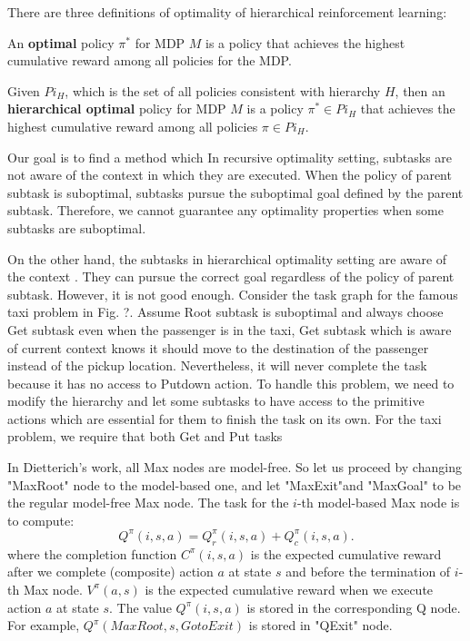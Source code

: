 There are three definitions of optimality of hierarchical reinforcement learning:

\begin{definition}
    An \textbf{optimal} policy $\pi^*$ for MDP $M$ is a policy that achieves the highest cumulative reward
    among all policies for the MDP.
\end{definition}
\begin{definition}
    Given $Pi_H$, which is the set of all policies consistent with hierarchy $H$, 
    then an \textbf{hierarchical optimal} policy for MDP $M$ is a policy $\pi^* \in Pi_H$ that achieves the highest cumulative reward
    among all policies $\pi \in Pi_H$.
\end{definition}


Our goal is to find a method which 
In recursive optimality setting, subtasks are not aware of the context in which they are executed.
When the policy of parent subtask is suboptimal, subtasks pursue the suboptimal goal defined by the parent subtask.
Therefore, we cannot guarantee any optimality properties when some subtasks are suboptimal.

On the other hand, the subtasks in hierarchical optimality setting are aware of the context . 
They can pursue the correct goal regardless of the policy of parent subtask.
However, it is not good enough. Consider the task graph for the famous taxi problem in Fig. ?.  
Assume Root subtask is suboptimal and always choose Get subtask even when 
the passenger is in the taxi, Get subtask which is aware of current context knows
it should move to the destination of the passenger instead of the pickup location.
Nevertheless, it will never complete the task because it has no access to Putdown 
action. To handle this problem, we need to modify the hierarchy and let some subtasks 
to have access to the primitive actions which are essential for them to finish
the task on its own. For the taxi problem, we require that both Get and Put tasks


In Dietterich's work, all Max nodes are model-free. 
So let us proceed by changing "MaxRoot" node to the model-based one, and let "MaxExit"and "MaxGoal"
to be the regular model-free Max node.
The task for the $i$-th model-based Max node is to compute:
\begin{equation}
    Q^{\pi}(i, s, a) = Q_r^{\pi}(i, s, a) + Q_c^{\pi}(i, s, a).
    \label{eq:MaxQ}
\end{equation}
where the completion function $C^{\pi}(i, s, a)$ is the expected cumulative reward after
we complete (composite) action $a$ at state $s$ and before the termination of $i$-th Max node.
$V^{\pi}(a, s)$ is the 
expected cumulative reward when we execute action $a$ at state $s$.
The value $Q^{\pi}(i, s, a)$ is stored in the corresponding Q node.
For example, $Q^{\pi}(MaxRoot, s, GotoExit)$ is stored in "QExit" node.





